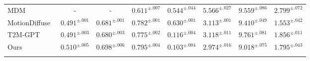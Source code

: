 \documentclass[10pt,twocolumn,letterpaper]{article}
\begin{document}
\begin{table*}[ht]
{\begin{tabular}{lccccccc}
\hline

MDM~\cite{tevet2022human} & - & - & $0.611^{\pm.007}$ &  $0.544^{\pm.044}$ & $5.566^{\pm.027}$ & $9.559^{\pm.086}$ & \cellcolor{red!25}$2.799^{\pm.072}$ \\

MotionDiffuse~\cite{zhang2022motiondiffuse} & \cellcolor{blue!25} $0.491^{\pm.001}$ & \cellcolor{blue!25} $0.681^{\pm.001}$ & \cellcolor{blue!25} $0.782^{\pm.001}$ & $0.630^{\pm.001}$ & \cellcolor{blue!25} $3.113^{\pm.001}$ & \cellcolor{red!25} $9.410^{\pm.049}$ &  $1.553^{\pm.042}$ \\

T2M-GPT~\cite{zhang2023generating} & \cellcolor{blue!25} $0.491^{\pm.003}$ & $0.680^{\pm.003}$ & $0.775^{\pm.002}$ & \cellcolor{blue!25} $0.116^{\pm.004}$ & $3.118^{\pm.011}$ & \cellcolor{blue!25} $9.761^{\pm.081}$ & $1.856^{\pm .011}$ \\

\hline
Ours & \cellcolor{red!25} $0.510^{\pm.005}$ & \cellcolor{red!25} $0.698^{\pm.006}$ & \cellcolor{red!25} $0.795^{\pm.004}$ & \cellcolor{red!25} $0.103^{\pm.004}$ & \cellcolor{red!25} $2.974^{\pm.016}$ & $9.018^{\pm.075}$ & $1.795^{\pm.043}$ \\
\hline
\vspace{-10pt}
\end{tabular}}
\end{table*}
\end{document}
